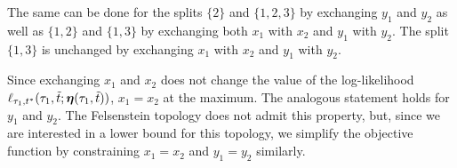 The same can be done for the splits $\{2\}$ and $\{1,2,3\}$ by exchanging $y_1$ and $y_2$ as well as $\{1,2\}$ and $\{1,3\}$ by exchanging both $x_1$ with $x_2$ and $y_1$ with $y_2$.
The split $\{1,3\}$ is unchanged by exchanging $x_1$ with $x_2$ and $y_1$ with $y_2$.

Since exchanging $x_1$ and $x_2$ does not change the value of the log-likelihood $\ell_{\tau_1,t^*}(\tau_1, \tilde{t}; \boldsymbol\eta(\tau_1,\tilde{t}))$, $x_1=x_2$ at the maximum.
The analogous statement holds for $y_1$ and $y_2$.
The Felsenstein topology does not admit this property, but, since we are interested in a lower bound for this topology, we simplify the objective function by constraining $x_1=x_2$ and $y_1=y_2$ similarly.

\topoInconsist*

